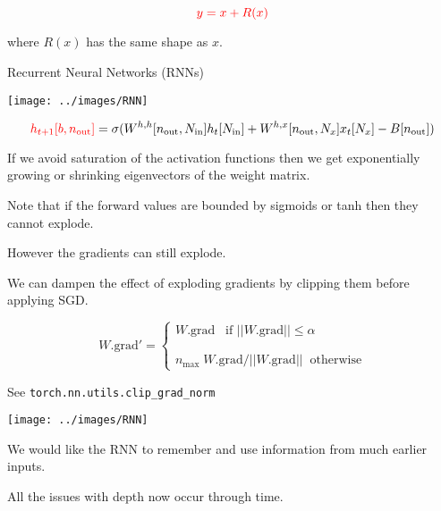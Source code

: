 {

$${\color{red} y = x + R(x)}$$

\vfill
where $R(x)$ has the same shape as $x$.

\slide{}
\vfill
\centerline{Recurrent Neural Networks (RNNs)}
\vfill
\vfill




\centerline{\texttt{[image: ../images/RNN]}}

\vfill

{\huge
$${\color{red} h_{t+1}[b,n_{\mathrm{out}}]} = \sigma(W^{h,h}[n_{\mathrm{out}},N_{\mathrm{in}}]h_t[N_{\mathrm{in}}] + W^{h,x}[n_{\mathrm{out}},N_x]x_t[N_x] - B[n_{\mathrm{out}}])$$
}


\vfill
If we avoid saturation of the activation functions then we get exponentially growing or shrinking eigenvectors of the weight matrix.

\vfill
Note that if the forward values are bounded by sigmoids or tanh then they cannot explode.

\vfill
However the gradients can still explode.


\vfill
We can dampen the effect of exploding gradients by clipping them before applying SGD.

\vfill
$$W.\mathrm{grad'} = \left\{\begin{array}{l} W.\mathrm{grad} \;\;\;\mbox{if $||W.\mathrm{grad}|| \leq \alpha$} \\
                                                      \\ \\
                                                      n_{\mathrm{max}} \; W.\mathrm{grad} / ||W.\mathrm{grad}|| \;\; \mbox{otherwise}
\end{array} \right.$$

\vfill
See {\tt torch.nn.utils.clip\_grad\_norm}


\centerline{\texttt{[image: ../images/RNN]}}

\vfill
We would like the RNN to {\color{red} remember and use} information from much earlier inputs.


\vfill
All the issues with depth now occur through time.

}
